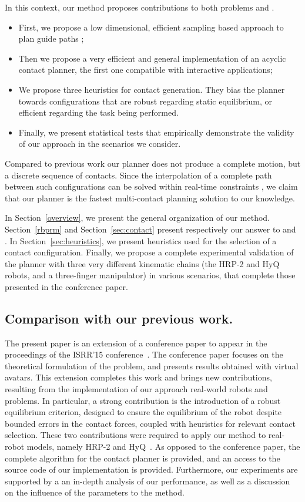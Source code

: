 In this context, our method proposes contributions to both problems \Pa and \Pb.
\begin{itemize}
\item First, we propose a low dimensional, efficient sampling based approach to plan guide paths ;
\item Then we propose a very efficient and general implementation of an acyclic contact planner, the first one compatible with \gls{interactive} applications;
\item We propose three heuristics for contact generation. They bias the planner towards configurations that are robust regarding static equilibrium, or 
efficient regarding the task being performed.
\item Finally, we present statistical tests that empirically demonstrate the validity of our approach in the scenarios we consider. 
\end{itemize}

Compared to previous work \citep{Mordatch:2012:DCB:2185520.2185539} our planner does not produce a complete motion, but a discrete sequence of contacts.
Since the interpolation of a complete path between such configurations can be solved within real-time constraints \citep{Carpentier2016}, we claim that our planner
is the fastest multi-contact planning solution to our knowledge.


In Section~\ref{overview}, we present the general organization of our method. Section~\ref{rbprm} and Section~\ref{sec:contact} present respectively our answer to \Pa and \Pb. In Section~\ref{sec:heuristics}, we present heuristics used for the selection of a contact configuration. Finally, we propose a complete experimental validation of the planner with three very different kinematic chains (the HRP-2 and HyQ robots, and a three-finger manipulator) in various scenarios,
that complete those presented in the conference paper.
\subsection*{Comparison with our previous work.}
The present paper is an extension of a conference paper to appear in the proceedings of the ISRR'15 conference~\citep{tonneauisrr15}.
The conference paper focuses on the theoretical formulation of the problem, and presents results obtained with virtual avatars.
This extension completes this work and brings new contributions, resulting from the implementation of our approach real-world robots and problems.
In particular, a strong contribution is the introduction of a robust equilibrium criterion, designed to ensure the equilibrium of the robot despite bounded errors in the contact forces, coupled
with heuristics for relevant contact selection. These two contributions were required to apply our method to real-robot models, namely HRP-2 and HyQ~\citep{semini11hyqdesignjsce}.
As opposed to the conference paper, the complete algorithm for the contact planner is provided, and an access to the source code of our implementation is provided.
Furthermore, our experiments are supported by a an in-depth analysis of our performance, as well as a discussion on the influence of the parameters to the method.

